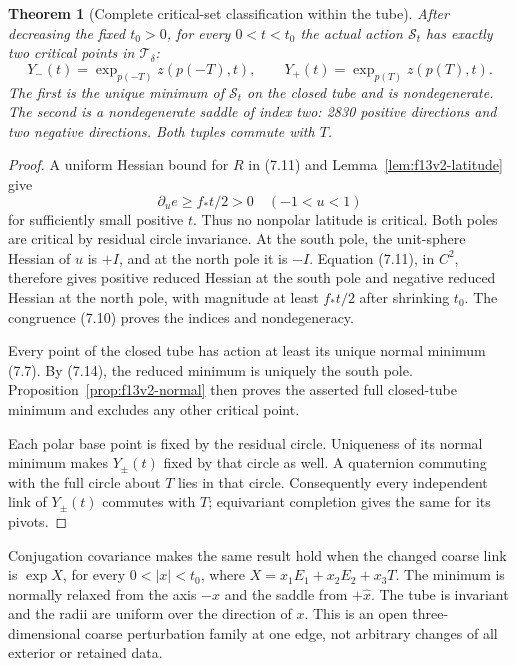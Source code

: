 \documentclass[11pt,oneside]{article}
\newtheorem{theorem}{Theorem}[section]
\newcommand{\cS}{\mathcal S}
\newcommand{\cT}{\mathcal T}
\begin{document}
\begin{theorem}[Complete critical-set classification within the tube]
\label{thm:f13v2-split}
After decreasing the fixed \(t_0>0\),
for every \(0<t<t_0\) the actual
action \(\cS_t\) has exactly two
critical points in \(\cT_\delta\):
\[
 Y_-(t)=\exp_{p(-T)}z(p(-T),t),\qquad
 Y_+(t)=\exp_{p(T)}z(p(T),t).
 \tag{7.13}
\]
The first is the unique minimum of
\(\cS_t\) on the closed tube and is
nondegenerate. The second is a
nondegenerate saddle of index two:
2830 positive directions and two
negative directions. Both tuples
commute with \(T\).
\end{theorem}
\begin{proof}
A uniform Hessian bound for \(R\)
in (7.11) and Lemma~\ref{lem:f13v2-latitude}
give
\[
                 \partial_u e\ge f_*t/2>0
                                  \quad(-1<u<1)
 \tag{7.14}
\]
for sufficiently small positive \(t\).
Thus no nonpolar latitude is critical.
Both poles are critical by residual
circle invariance. At the south pole,
the unit-sphere Hessian of \(u\) is
\(+I\), and at the north pole it is
\(-I\). Equation (7.11), in \(C^2\),
therefore gives positive reduced
Hessian at the south pole and
negative reduced Hessian at the north
pole, with magnitude at least
\(f_*t/2\) after shrinking \(t_0\).
The congruence (7.10) proves the
indices and nondegeneracy.

Every point of the closed tube has
action at least its unique normal
minimum (7.7). By (7.14), the reduced
minimum is uniquely the south pole.
Proposition~\ref{prop:f13v2-normal}
then proves the asserted full
closed-tube minimum and excludes
any other critical point.

Each polar base point is fixed
by the residual circle. Uniqueness
of its normal minimum makes
\(Y_\pm(t)\) fixed by that circle
as well. A quaternion commuting
with the full circle about \(T\)
lies in that circle. Consequently
every independent link of
\(Y_\pm(t)\) commutes with \(T\);
equivariant completion gives the
same for its pivots.
\end{proof}

Conjugation covariance makes the
same result hold when the changed
coarse link is \(\exp X\), for
every \(0<|x|<t_0\), where
\(X=x_1E_1+x_2E_2+x_3T\).
The minimum is normally relaxed
from the axis \(-\widehat x\)
and the saddle from \(+\widehat x\).
The tube is invariant and the
radii are uniform over the
direction of \(x\). This is an
open three-dimensional coarse
perturbation family at one edge,
not arbitrary changes of all
exterior or retained data.
\end{document}
